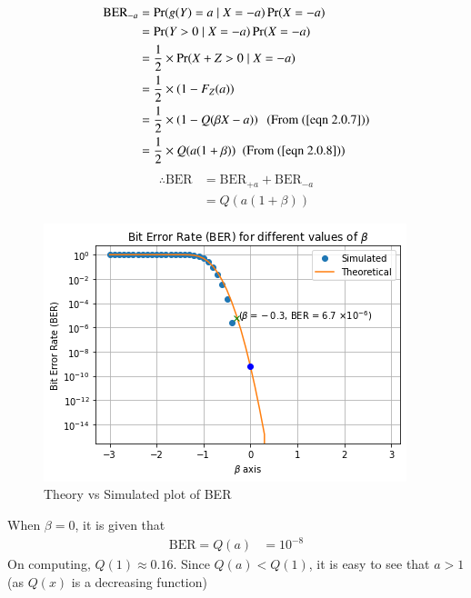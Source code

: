 \documentclass[journal,10pt,twocolumn]{IEEEtran}
\begin{document}
\begin{align}
\text{BER}_{-a} %
&= \Pr(g(Y) = a \;|\; X = -a) \Pr(X=-a)\\
&= \Pr(Y > 0 \;|\; X = -a) \Pr(X=-a)\\
&= \dfrac{1}{2} \times \Pr(X+Z > 0 \;|\; X = -a) \\
&= \dfrac{1}{2} \times \left( 1 - F_Z(a) \right) \\
&= \dfrac{1}{2} \times \left( 1 - Q(\beta X -a) \right) \; \text{ (From (\ref{eqn 2.0.7}))}\\
&= \dfrac{1}{2} \times Q(a(1+\beta)) \; \text{ (From (\ref{eqn 2.0.8}))}
\end{align}
\begin{align}
\therefore \text{BER} &= \text{BER}_{+a} + \text{BER}_{-a}\\
&= Q(a(1+\beta))
\end{align} 
\begin{figure}[!hbt]
    \centering
	\includegraphics[width=\columnwidth]{./Figures/Figure_3.png}
    \caption{Theory vs Simulated plot of BER}
    \label{CDF_Y}
\end{figure}
When $\beta = 0$, it is given that 
\begin{align}
\text{BER} = Q(a) &= 10^{-8}
\end{align}
On computing, $Q(1) \approx 0.16$. Since $Q(a)<Q(1)$, it is easy to see that $a>1$ (as $Q(x)$ is a decreasing function)
\end{document}
